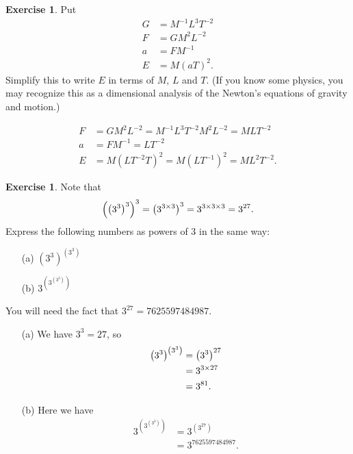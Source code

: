 \documentclass[a4paper]{book}
\theoremstyle{definition}
\newtheorem{exercise}[theorem]{Exercise}
\renewenvironment{solution}{\SolutionInline}{\endSolutionInline}
\begin{document}
\begin{exercise}
 Put 
 \begin{align*}
  G &= M^{-1}L^3T^{-2} \\
  F &= GM^2L^{-2} \\
  a &= FM^{-1} \\
  E &= M(aT)^2.  
 \end{align*}
 Simplify this to write $E$ in terms of $M$, $L$ and $T$.  (If you
 know some physics, you may recognize this as a dimensional analysis
 of the Newton's equations of gravity and motion.) 
\end{exercise}
\begin{solution}
 \begin{align*}
  F &= GM^2L^{-2} = M^{-1}L^3T^{-2}M^2L^{-2} = MLT^{-2} \\
  a &= FM^{-1} = LT^{-2} \\
  E &= M(LT^{-2}T)^2 = M(LT^{-1})^2 = ML^2T^{-2}.
 \end{align*}
\end{solution}
\begin{exercise}
 Note that
 {\Large
  \[ \left(\left(3^3\right)^3\right)^3 =
      \left(3^{3\times 3}\right)^3 =
       3^{3\times 3\times 3} = 3^{27}.
  \]}
 Express the following numbers as powers of $3$ in the same way:
 \begin{itemize}
  \item[(a)] {\Large $\left(3^3\right)^{\left(3^3\right)}$}
  \item[(b)] {\Large $3^{\left(3^{\left(3^3\right)}\right)}$}
 \end{itemize}
 You will need the fact that $3^{27}=7625597484987$.
\end{exercise}
\begin{solution}
 \begin{itemize}
  \item[(a)] We have $3^3=27$, so 
   {\Large
     \begin{align*}
      \left(3^3\right)^{\left(3^3\right)}
      &= \left(3^3\right)^{27} \\
      &= 3^{3\times 27} \\
      &= 3^{81}.
     \end{align*}
   }
  \item[(b)] Here we have
   {\Large \begin{align*}
    3^{\left(3^{\left(3^3\right)}\right)} &=
     3^{\left(3^{27}\right)} \\
     &= 3^{7625597484987}.
   \end{align*}}
 \end{itemize}
\end{solution}
\end{document}
